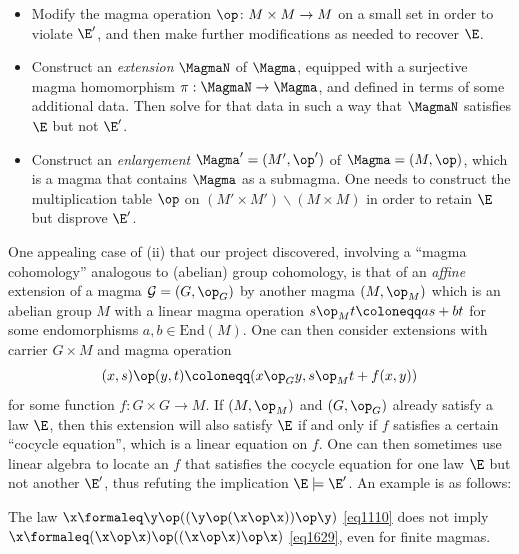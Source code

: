 \begin{itemize}
  \item[(i)]  Modify the magma operation $\op \colon M \times M \to M$ on a small set in order to violate ${\E'}$, and then make further modifications as needed to recover $\E$.
  \item[(ii)]  Construct an \emph{extension} $\MagmaN$ of $\Magma$, equipped with a surjective magma homomorphism $\pi: \MagmaN \to \Magma$, and defined in terms of some additional data.  Then solve for that data in such a way that $\MagmaN$ satisfies $\E$ but not ${\E'}$.
  \item[(iii)]  Construct an \emph{enlargement} $\Magma' = (M',\op')$ of $\Magma = (M,\op)$, which is a magma that contains $\Magma$ as a submagma.  One needs to construct the multiplication table $\op$ on $(M' \times M') \backslash (M \times M)$ in order to retain $\E$ but disprove ${\E'}$.
\end{itemize}

One appealing case of (ii) that our project discovered, involving a ``magma cohomology'' analogous to (abelian) group cohomology, is that of an \emph{affine} extension of a magma ${\mathcal G} = (G,\op_G)$ by another magma $(M,\op_M)$ which is an abelian group $M$ with a linear magma operation $s \op_M t \coloneqq as + bt$ for some endomorphisms $a,b \in \mathrm{End}(M)$.  One can then consider extensions with carrier $G \times M$ and magma operation
\begin{equation}\label{xsyt}
 (x, s) \op (y, t) \coloneqq (x \op_G y, s \op_M t + f(x,y))
\end{equation}
for some function $f \colon G \times G \to M$.  If $(M,\op_M)$ and $(G,\op_G)$ already satisfy a law $\E$, then this extension will also satisfy $\E$ if and only if $f$ satisfies a certain ``cocycle equation'', which is a linear equation on $f$.  One can then sometimes use linear algebra to locate an $f$ that satisfies the cocycle equation for one law $\E$ but not another ${\E'}$, thus refuting the implication $\E \models {\E'}$.  An example is as follows:

\begin{proposition}[$\Eq{1110} \nmodels \Eq{1629}$]\label{1110-1629} The law $\x \formaleq \y \op ((\y \op (\x \op \x)) \op \y)$ \eqref{eq1110} does not imply $\x \formaleq (\x \op \x) \op ((\x \op \x) \op \x)$ \eqref{eq1629}, even for finite magmas.
\end{proposition}

